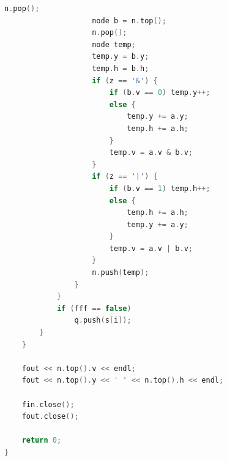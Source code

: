 \documentclass[12pt,twiside,a4paper]{ctexbook}
\numberwithin{chapter}{part}
\begin{document}
\begin{lstlisting}[language=C++]
                    n.pop();
                    node b = n.top();
                    n.pop();
                    node temp;
                    temp.y = b.y;
                    temp.h = b.h;
                    if (z == '&') {
                        if (b.v == 0) temp.y++;
                        else {
                            temp.y += a.y;
                            temp.h += a.h;
                        }
                        temp.v = a.v & b.v;
                    }
                    if (z == '|') {
                        if (b.v == 1) temp.h++;
                        else {
                            temp.h += a.h;
                            temp.y += a.y;
                        }
                        temp.v = a.v | b.v;
                    }
                    n.push(temp);
                }
            }
            if (fff == false)
                q.push(s[i]);
        }
    }
    
    fout << n.top().v << endl;
    fout << n.top().y << ' ' << n.top().h << endl;

    fin.close();
    fout.close();

    return 0;
}
\end{lstlisting}
\end{document}
